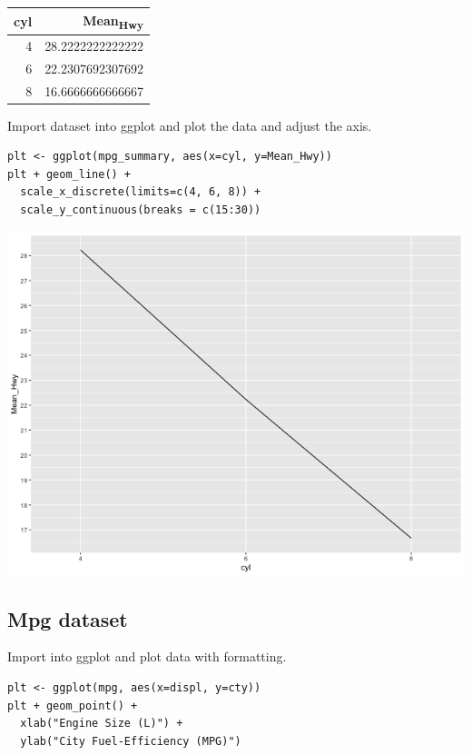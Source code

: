 \documentclass[11pt]{article}
\begin{document}
\begin{org}
\begin{center}
\begin{tabular}{rr}
cyl & Mean\textsubscript{Hwy}\\
\hline
4 & 28.2222222222222\\
6 & 22.2307692307692\\
8 & 16.6666666666667\\
\end{tabular}
\end{center}
\end{org}

Import dataset into ggplot and plot the data and adjust the axis.

\begin{verbatim}
plt <- ggplot(mpg_summary, aes(x=cyl, y=Mean_Hwy))
plt + geom_line() +
  scale_x_discrete(limits=c(4, 6, 8)) +
  scale_y_continuous(breaks = c(15:30))
\end{verbatim}

\begin{org}
\begin{center}
\includegraphics[width=.9\linewidth]{./resources/mpg_summary.png}
\end{center}
\end{org}

\subsection{Mpg dataset}
\label{sec:orgbdc0c29}

Import into ggplot and plot data with formatting.

\begin{verbatim}
plt <- ggplot(mpg, aes(x=displ, y=cty))
plt + geom_point() +
  xlab("Engine Size (L)") +
  ylab("City Fuel-Efficiency (MPG)")
\end{verbatim}
\end{document}

